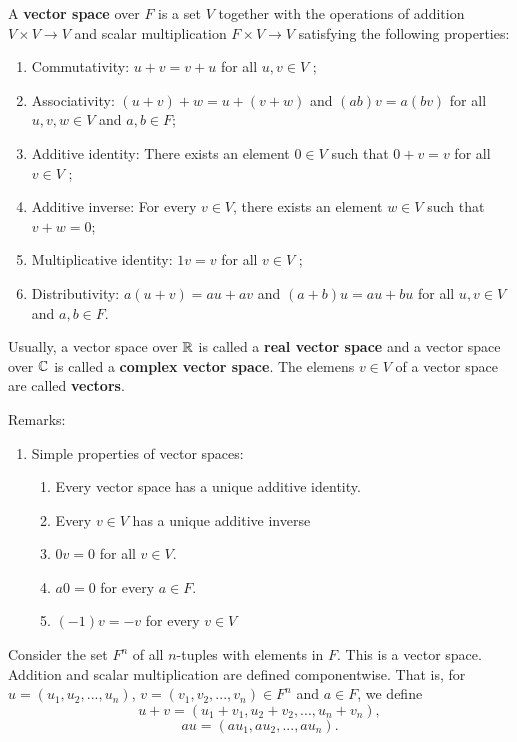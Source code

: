\documentclass[12pt]{book}
\begin{document}
\begin{defi}\label{def:vcs}
      A \textbf{vector space} over $F$ is a set $V$ together with the operations of addition $V \times V \rightarrow V $ and scalar multiplication 
	  $F \times V \rightarrow V$ satisfying the following properties:
	  \begin{enumerate}
	        \item Commutativity: $u + v = v + u$ for all $u, v \in V$ ;
			\item Associativity: $(u + v) + w = u + (v + w)$ and $(ab)v = a(bv)$ for all $u, v,w \in V$ and $a, b \in F$;
			\item Additive identity: There exists an element $0 \in V$ such that $0 + v = v$ for all $v \in V$ ;
			\item Additive inverse: For every $v \in V$, there exists an element $w \in V$ such that $v+w = 0$;
			\item Multiplicative identity: $1v = v$ for all $v \in V$ ;
			\item Distributivity: $a(u + v) = au + av$ and $(a + b)u = au + bu$ for all $u, v \in V$ and $a, b \in F$.
      \end{enumerate}
\end{defi}
Usually, a vector space over $\mathbb{R}$ is called a \textbf{real vector space} and a vector space over $\mathbb{C}$ is called a \textbf{complex vector space}. 
The elemens $v \in V$ of a vector space are called \textbf{vectors}.

Remarks:
\begin{enumerate}
	  \item Simple properties of vector spaces:
	        \begin{enumerate}
			      \item Every vector space has a unique additive identity.
				  \item Every $v \in V$ has a unique additive inverse
				  \item $0v = 0$ for all $v \in V$.
				  \item $a0 = 0$ for every $a \in F$.
				  \item $(−1)v = −v$ for every $v \in V$
		    \end{enumerate}
\end{enumerate}

\begin{examp}\label{exp:vs12}
      Consider the set $F^n$ of all $n$-tuples with elements in $F$. This is a vector space. Addition and scalar multiplication are
	  defined componentwise. That is, for $u = (u_1, u_2, ... , u_n)$, $v = (v_1, v_2, . . . , v_n) \in F^n$ and $a \in F$, we define
	  $$u + v = (u_1 + v_1, u_2 + v_2, . . . , u_n + v_n),$$
	  $$au = (au_1, au_2, . . . , au_n).$$      
\end{examp}
\end{document}
